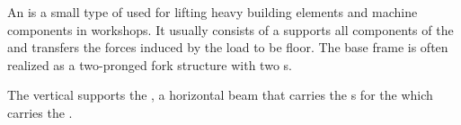 \begin{module}[id=assembly-crane]
  \begin{definition}
    An  is a small type of  used for lifting
    heavy building elements and machine components in workshops. It usually consists of a
     supports all components of the  and
    transfers the forces induced by the load to be floor. The base frame is often realized
    as a two-pronged fork structure with two s.

    The vertical  supports the , a horizontal beam that carries the
    s for the  which carries the
    .
\end{definition}

\end{module}
